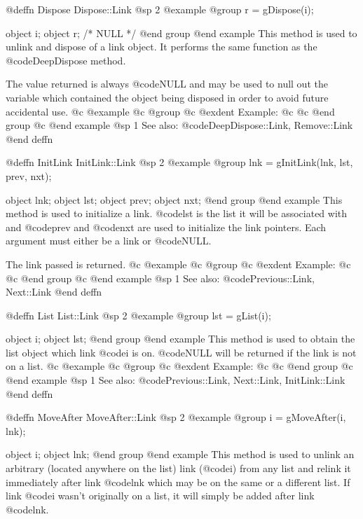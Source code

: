 @deffn {Dispose} Dispose::Link
@sp 2
@example
@group
r = gDispose(i);

object  i;
object  r;     /*  NULL  */
@end group
@end example
This method is used to unlink and dispose of a link object.
It performs the same function as the @code{DeepDispose} method.

The value returned is always @code{NULL} and may be used to null out
the variable which contained the object being disposed in order to
avoid future accidental use.
@c @example
@c @group
@c @exdent Example:
@c 
@c @end group
@c @end example
@sp 1
See also:  @code{DeepDispose::Link, Remove::Link}
@end deffn














@deffn {InitLink} InitLink::Link
@sp 2
@example
@group
lnk = gInitLink(lnk, lst, prev, nxt);

object  lnk;
object  lst;
object  prev;
object  nxt;
@end group
@end example
This method is used to initialize a link.  @code{lst} is the list it will
be associated with and @code{prev} and @code{nxt} are used to initialize
the link pointers.  Each argument must either be a link or @code{NULL}.

The link passed is returned.
@c @example
@c @group
@c @exdent Example:
@c 
@c @end group
@c @end example
@sp 1
See also:  @code{Previous::Link, Next::Link}
@end deffn





@deffn {List} List::Link
@sp 2
@example
@group
lst = gList(i);

object  i;
object  lst;
@end group
@end example
This method is used to obtain the list object which link @code{i}
is on.  @code{NULL} will be returned if the link is not on a list.
@c @example
@c @group
@c @exdent Example:
@c 
@c @end group
@c @end example
@sp 1
See also:  @code{Previous::Link, Next::Link, InitLink::Link}
@end deffn









@deffn {MoveAfter} MoveAfter::Link
@sp 2
@example
@group
i = gMoveAfter(i, lnk);

object  i;
object  lnk;
@end group
@end example
This method is used to unlink an arbitrary (located anywhere on the
list) link (@code{i}) from any list and relink it immediately after link
@code{lnk} which may be on the same or a different list.  If link
@code{i} wasn't originally on a list, it will simply be added after
link @code{lnk}.

